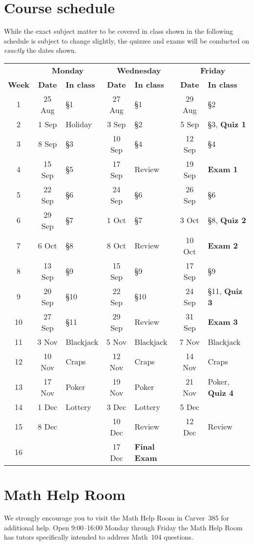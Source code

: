 \documentclass[11pt]{article}
\begin{document}
\section{Course schedule}\label{Schedule} While the exact subject
matter to be covered in class shown in the following schedule is
subject to change slightly, the quizzes and exams will be conducted
on {\em exactly} the dates shown.

\begin{tabular}{c|cl|cl|cl}
&\multicolumn{2}{c|}{\bf Monday}
&\multicolumn{2}{c|}{\bf Wednesday}
&\multicolumn{2}{c}{\bf Friday}\\
{\bf Week}&{\bf Date}&{\bf In class}
&{\bf Date}&{\bf In class}&{\bf Date}&{\bf In class}\\\toprule
1&25 Aug&\S1&27 Aug&\S1&29 Aug&\S2\\\midrule
2&1 Sep&Holiday&3 Sep&\S2&5 Sep&\S3, {\bf Quiz 1}\\\midrule
3&8 Sep&\S3&10 Sep&\S4&12 Sep&\S4\\\midrule
4&15 Sep&\S5&17 Sep&Review&19 Sep&{\bf Exam 1}\\\midrule
5&22 Sep&\S6&24 Sep&\S6&26 Sep&\S6\\\midrule
6&29 Sep&\S7&1 Oct&\S7&3 Oct&\S8, {\bf Quiz 2}\\\midrule
7&6 Oct&\S8&8 Oct&Review&10 Oct&{\bf Exam 2}\\\midrule
8&13 Sep&\S9&15 Sep&\S9&17 Sep&\S9\\\midrule
9&20 Sep&\S10&22 Sep&\S10&24 Sep&\S11, {\bf Quiz 3}\\\midrule
10&27 Sep&\S11&29 Sep&Review&31 Sep&{\bf Exam 3}\\\midrule
11&3 Nov&Blackjack&5 Nov&Blackjack&7 Nov&Blackjack\\\midrule
12&10 Nov&Craps&12 Nov&Craps&14 Nov&Craps\\\midrule
13&17 Nov&Poker&19 Nov&Poker&21 Nov&Poker, {\bf Quiz 4}\\\midrule
14&1 Dec&Lottery&3 Dec&Lottery&5 Dec&\\\midrule
15&8 Dec&&10 Dec&Review&12 Dec&Review\\\midrule
16&&&17 Dec&{\bf Final Exam}&&
\end{tabular}

\section{Math Help Room}\label{MathCenter}
We strongly encourage you to visit the Math Help Room
in Carver~385 for additional help.
Open 9:00--16:00 Monday through Friday the Math Help Room
has tutors specifically intended to address Math~104 questions.
\end{document}
